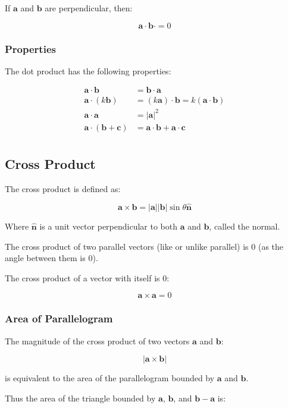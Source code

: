\documentclass[a4paper,11pt]{article}
\newcommand{\bb}{\boldsymbol}
\begin{document}
If $\bb{a}$ and $\bb{b}$ are perpendicular, then:

$$
\bb{a} \cdot \bb{b}\cdot = 0
$$


\subsubsection{Properties}

The dot product has the following properties:

$$
\begin{aligned}
\bb{a} \cdot \bb{b} & = \bb{b} \cdot \bb{a} \\
\bb{a} \cdot (k \bb{b}) & = (k \bb{a}) \cdot \bb{b} = k (\bb{a} \cdot \bb{b}) \\
\bb{a} \cdot \bb{a} & = \lvert \bb{a} \rvert^2 \\
\bb{a} \cdot (\bb{b} + \bb{c}) & = \bb{a} \cdot \bb{b} + \bb{a} \cdot \bb{c} \\
\end{aligned}
$$


\subsection{Cross Product}

The cross product is defined as:

$$
\bb{a} \times \bb{b} = \lvert \bb{a} \rvert \lvert \bb{b} \rvert \sin{\theta} \hat{\bb{n}}
$$

Where $\hat{\bb{n}}$ is a unit vector perpendicular to both $\bb{a}$ and
$\bb{b}$, called the normal.

The cross product of two parallel vectors (like or unlike parallel) is 0 (as
the angle between them is 0).

The cross product of a vector with itself is 0:

$$
\bb{a} \times \bb{a} = 0
$$


\subsubsection{Area of Parallelogram}

The magnitude of the cross product of two vectors $\bb{a}$ and $\bb{b}$:

$$
\lvert \bb{a} \times \bb{b} \rvert
$$

is equivalent to the area of the parallelogram bounded by $\bb{a}$ and $\bb{b}$.

Thus the area of the triangle bounded by $\bb{a}$, $\bb{b}$, and
$\bb{b} - \bb{a}$ is:
\end{document}
